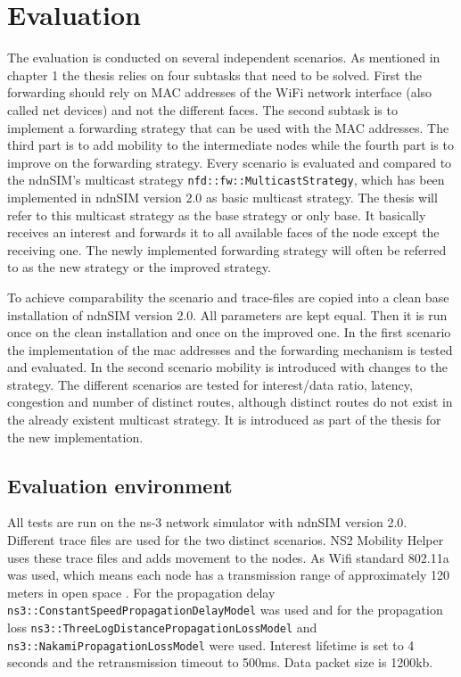 \chapter{Evaluation}

The evaluation is conducted on several independent scenarios. As mentioned in chapter 1 the thesis relies on four subtasks that need to be solved. First the forwarding should rely on MAC addresses of the WiFi network interface (also called net devices) and not the different faces. The second subtask is to implement a forwarding strategy that can be used with the MAC addresses. The third part is to add mobility to the intermediate nodes while the fourth part is to improve on the forwarding strategy. Every scenario is evaluated and compared to the ndnSIM's multicast strategy \texttt{nfd::fw::MulticastStrategy}, which has been implemented in ndnSIM version 2.0 as basic multicast strategy. The thesis will refer to this multicast strategy as the base strategy or only base. It basically receives an interest and forwards it to all available faces of the node except the receiving one. The newly implemented forwarding strategy will often be referred to as the new strategy or the improved strategy.

To achieve comparability the scenario and trace-files are copied into a clean base installation of ndnSIM version 2.0. All parameters are kept equal. Then it is run once on the clean installation and once on the improved one. In the first scenario the implementation of the mac addresses and the forwarding mechanism is tested and evaluated. In the second scenario mobility is introduced with changes to the strategy. The different scenarios are tested for interest/data ratio, latency, congestion and number of distinct routes, although distinct routes do not exist in the already existent multicast strategy. It is introduced as part of the thesis for the new implementation.

\section{Evaluation environment}

All tests are run on the ns-3 network simulator with ndnSIM version 2.0. Different trace files are used for the two distinct scenarios. NS2 Mobility Helper uses these trace files and adds movement to the nodes. As Wifi standard 802.11a was used, which means each node has a transmission range of approximately 120 meters in open space \cite{wifi80211a} . For the propagation delay \texttt{ns3::ConstantSpeedPropagationDelayModel} was used and for the propagation loss \texttt{ns3::ThreeLogDistancePropagationLossModel} and \texttt{ns3::NakamiPropagationLossModel} were used. Interest lifetime is set to 4 seconds and the retransmission timeout to 500ms. Data packet size is 1200kb.

